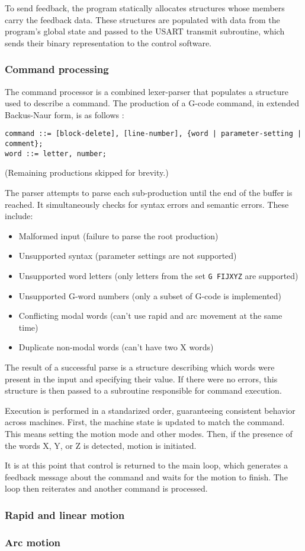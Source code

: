 To send feedback, the program statically allocates structures whose members
carry the feedback data. These structures are populated with data from the
program's global state and passed to the USART transmit subroutine, which sends
their binary representation to the control software.

\subsubsection{Command processing}

The command processor is a combined lexer-parser that populates a structure used
to describe a command. The production of a G-code command, in extended
Backus-Naur form, is as follows \cite{gcode}:
\footnotesize
\begin{verbatim}command ::= [block-delete], [line-number], {word | parameter-setting | comment};
word ::= letter, number;\end{verbatim}
\normalsize
(Remaining productions skipped for brevity.)

The parser attempts to parse each sub-production until the end of the buffer is
reached. It simultaneously checks for syntax errors and semantic errors. These
include:
\begin{itemize}
    \item Malformed input (failure to parse the root production)
    \item Unsupported syntax (parameter settings are not supported)
    \item Unsupported word letters (only letters from the set \texttt{G FIJXYZ}
    are supported)
    \item Unsupported G-word numbers (only a subset of G-code is implemented)
    \item Conflicting modal words (can't use rapid and arc movement at the same
    time)
    \item Duplicate non-modal words (can't have two X words)
\end{itemize}
The result of a successful parse is a structure describing which words were
present in the input and specifying their value. If there were no errors, this
structure is then passed to a subroutine responsible for command execution.

Execution is performed in a standarized order, guaranteeing consistent behavior
across machines. First, the machine state is updated to match the command. This
means setting the motion mode and other modes. Then, if the presence of the
words X, Y, or Z is detected, motion is initiated.

It is at this point that control is returned to the main loop, which generates
a feedback message about the command and waits for the motion to finish. The
loop then reiterates and another command is processed.

\subsubsection{Rapid and linear motion}

\subsubsection{Arc motion}
